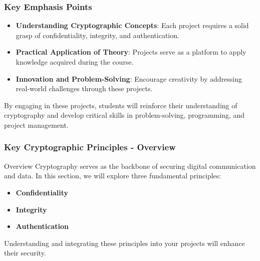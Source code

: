 \documentclass{beamer}
\begin{document}
\begin{frame}[fragile]
    \frametitle{Key Emphasis Points}
    \begin{itemize}
        \item \textbf{Understanding Cryptographic Concepts}: Each project requires a solid grasp of confidentiality, integrity, and authentication.
        \item \textbf{Practical Application of Theory}: Projects serve as a platform to apply knowledge acquired during the course.
        \item \textbf{Innovation and Problem-Solving}: Encourage creativity by addressing real-world challenges through these projects.
    \end{itemize}
    
    By engaging in these projects, students will reinforce their understanding of cryptography and develop critical skills in problem-solving, programming, and project management.

\end{frame}

\begin{frame}[fragile]
    \frametitle{Key Cryptographic Principles - Overview}
    \begin{block}{Overview}
        Cryptography serves as the backbone of securing digital communication and data. 
        In this section, we will explore three fundamental principles:
        \begin{itemize}
            \item \textbf{Confidentiality}
            \item \textbf{Integrity}
            \item \textbf{Authentication}
        \end{itemize}
        Understanding and integrating these principles into your projects will enhance their security.
    \end{block}
\end{frame}
\end{document}
